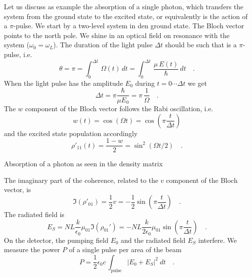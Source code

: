 Let us discuss as example the absorption of a single photon, which transfers the system from the ground state to the excited state, or equivalently is the action of a $\pi$-pulse. We start by a two-level system in den ground state. The Bloch vector points to the north pole. We shine in an optical field on resonance with the system ($\omega_0 = \omega_L$). The duration of the light pulse $\Delta t$ should be such that is a $\pi$-pulse, i.e.
\begin{equation}
 \theta = \pi = \int_0^{\Delta t} \, \Omega(t) \, dt =  \int_0^{\Delta t} \, \frac{ \mu \, E(t)}{\hbar} \, dt \quad .
\end{equation}
When the light pulse has the amplitude $E_0$ during $t= 0 \cdots \Delta t$ we get
\begin{equation}
 \Delta t = \pi \frac{\hbar}{\mu E_0}  = \pi \, \frac{1}{\Omega} \quad .
\end{equation} 
The $w$ component of the Bloch vector follows the Rabi oscillation, i.e.
\begin{equation}
 w(t) = \cos ( \Omega t  ) = \cos \left( \pi  \frac{t}{\Delta t} \right) 
\end{equation}
and the excited state population accordingly
\begin{equation}
 \rho'_{11}(t) = \frac{1 - w}{2}  = \sin^2 ( \Omega t /2 ) \quad .
\end{equation}
%
\begin{marginfigure}[-49mm]

\caption{Absorption of a photon as seen in the density matrix}
\label{fig:fid_rho_single_photon}
\end{marginfigure}
%
The imaginary part of the coherence, related to the $v$ component of the Bloch vector, is
\begin{equation}
 \Im (\rho'_{01} ) = \frac{1}{2} v =  - \frac{1}{2}  \sin \left( \pi \frac{t}{\Delta t} \right) \quad .
\end{equation}
The radiated field is 
\begin{equation}
 E_S  = N L \frac{k }{\epsilon_0}  \mu_{01} \Im (\rho_{01}' ) 
 = - N L \frac{k }{2 \epsilon_0}  \mu_{01} \sin \left( \pi \frac{t}{\Delta t} \right) \quad .
\end{equation}
On the detector, the pumping field $E_0$ and the radiated field $E_S$ interfere. We measure the power $P$ of a single pulse per area of the beam  
\begin{equation}
P  = \frac{1}{2} \epsilon_0 c \, \int_\text{pulse} | E_0 + E_S |^2 \ dt \quad .\label{eq:fid_P}
\end{equation}
